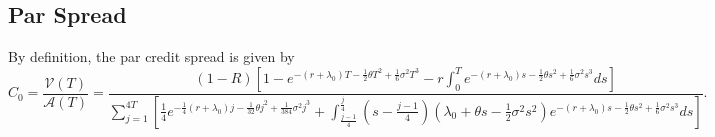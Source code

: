 \documentclass[paper=a4, fontsize=11pt]{scrartcl} %
\numberwithin{equation}{section} %
\numberwithin{figure}{section} %
\numberwithin{table}{section} %
\begin{document}
\subsection{Par Spread}
By definition, the par credit spread is given by
$$
C_0 = \frac{\mathcal{V}(T)}{\mathcal{A}(T)} = \frac{(1-R)\left[ 1-e^{-( r+\lambda_0) T - \frac{1}{2}\theta T^2 +\frac{1}{6}\sigma^2 T^3 } - r\int_0^T e^{ -(r+\lambda_0) s - \frac{1}{2}\theta s^2 +\frac{1}{6}\sigma^2 s^3}ds \right]}{\sum_{j=1}^{4T} \left[\frac{1}{4}e^{- \frac{1}{4}(r+\lambda_0)
j - \frac{1}{32}\theta j^2 +\frac{1}{384}\sigma^2 j^3 } + \int_{\frac{j-1}{4}}^{\frac{j}{4}} \left(s-\frac{j-1}{4}\right) \left(\lambda_0 + \theta s -\frac{1}{2}\sigma^2 s^2\right) e^{-(r+\lambda_0)s - \frac{1}{2}\theta s^2 + \frac{1}{6}\sigma^2 s^3} ds\right]}.
$$
\end{document}
